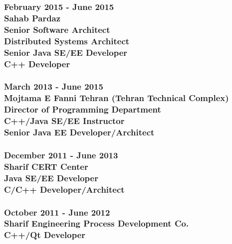 \documentclass[10pt,a4paper]{article}
\begin{document}
\subsubsection{\textnormal {February 2015 - June 2015} \\ \textnormal {Sahab Pardaz} \\ Senior Software Architect \\ Distributed Systems Architect \\ Senior Java SE/EE Developer \\ C++ Developer}
	\setlength{\leftskip}{0.5cm}
  \setlength{\rightskip}{1cm}
  \lipsum[2]
  \setlength{\leftskip}{0pt}
  \setlength{\rightskip}{0cm}
	  
\subsubsection{\textnormal {March 2013 - June 2015} \\ \textnormal {Mojtama E Fanni Tehran (Tehran Technical Complex)} \\ Director of Programming Department \\ C++/Java SE/EE Instructor \\ Senior Java EE Developer/Architect}
  \setlength{\leftskip}{0.5cm}
  \setlength{\rightskip}{1cm}
  \lipsum[2]
  \setlength{\leftskip}{0pt}
  \setlength{\rightskip}{0cm}
	  
\subsubsection{\textnormal {December 2011 - June 2013} \\ \textnormal {Sharif CERT Center} \\ Java SE/EE Developer \\ C/C++ Developer/Architect}
  \setlength{\leftskip}{0.5cm}
  \setlength{\rightskip}{1cm}
  \lipsum[2]
  \setlength{\leftskip}{0pt}
  \setlength{\rightskip}{0cm}
	  
\subsubsection{\textnormal {October 2011 - June 2012} \\ \textnormal {Sharif Engineering Process Development Co.} \\ C++/Qt Developer}
  \setlength{\leftskip}{0.5cm}
  \setlength{\rightskip}{1cm}
  \lipsum[2]
  \setlength{\leftskip}{0pt}
  \setlength{\rightskip}{0cm}
  
\end{document}
